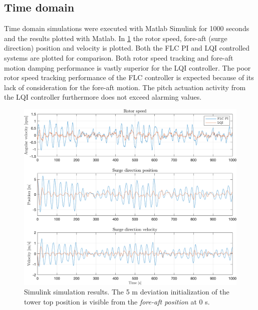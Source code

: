 \clearpage
\subsection{Time domain}
Time domain simulations were executed with Matlab Simulink for 1000 seconds and the results plotted with Matlab. In \cref{fig:sim_11_W_py_vy_comp} the rotor speed, fore-aft (surge direction) position and velocity is plotted. Both the FLC PI and LQI controlled systems are plotted for comparison. Both rotor speed tracking and fore-aft motion damping performance is vastly superior for the LQI controller. The poor rotor speed tracking performance of the FLC controller is expected because of its lack of consideration for the fore-aft motion. The pitch actuation activity from the LQI controller furthermore does not exceed alarming values.
\begin{figure}[ht]
	\centering
	\includegraphics[width=0.7\linewidth]{Graphics/TestResults/linearModPerf/sim_11_W_py_vy_comp.png}
	\caption{Simulink simulation results. The 5 m deviation initialization of the tower top position is visible from the \textit{fore-aft position} at 0 s.}
	\label{fig:sim_11_W_py_vy_comp}
\end{figure}